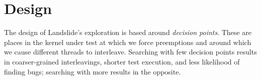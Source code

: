 \documentclass{llncs}
\begin{document}





\section{Design}
\label{sec:design}

The design of Landslide's exploration is based around {\em decision points}. These are places in the kernel under test at which we force preemptions and around which we cause different threads to interleave. Searching with few decision points results in coarser-grained interleavings, shorter test execution, and less likelihood of finding bugs; searching with more results in the opposite.
\end{document}
